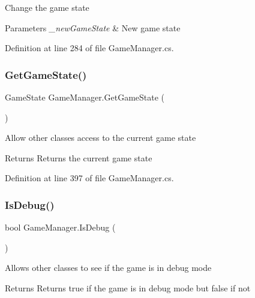 Change the game state 


\begin{DoxyParams}{Parameters}
{\em \+\_\+new\+Game\+State} & New game state\\
\hline
\end{DoxyParams}


Definition at line 284 of file Game\+Manager.\+cs.

\mbox{\label{class_game_manager_a58134230a7cde001ebf2b25f1dcd6091}} 
\subsubsection{\texorpdfstring{Get\+Game\+State()}{GetGameState()}}
{\footnotesize\ttfamily Game\+State Game\+Manager.\+Get\+Game\+State (\begin{DoxyParamCaption}{ }\end{DoxyParamCaption})}



Allow other classes access to the current game state 

\begin{DoxyReturn}{Returns}
Returns the current game state
\end{DoxyReturn}


Definition at line 397 of file Game\+Manager.\+cs.

\mbox{\label{class_game_manager_a35822d3c950f5d43e34c2f020d46c23d}} 
\subsubsection{\texorpdfstring{Is\+Debug()}{IsDebug()}}
{\footnotesize\ttfamily bool Game\+Manager.\+Is\+Debug (\begin{DoxyParamCaption}{ }\end{DoxyParamCaption})}



Allows other classes to see if the game is in debug mode 

\begin{DoxyReturn}{Returns}
Returns true if the game is in debug mode but false if not
\end{DoxyReturn}


